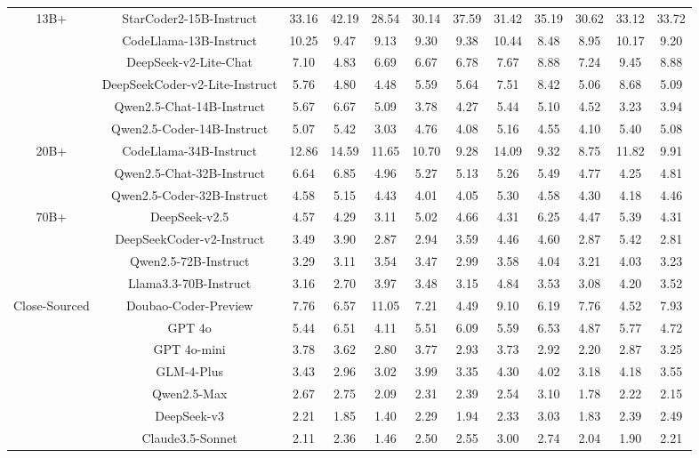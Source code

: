 \documentclass[11pt, a4paper, logo, copyright, nonumbering, amsart]{map}
\begin{document}
\begin{CJK*}{UTF8}{gbsn}
\begin{table*}[h!]
\begin{adjustbox}{width=\textwidth}
\begin{tabular}{c|c|cccccccccc}
    \midrule
    \multirow{6}{*}{13B+} 
    & StarCoder2-15B-Instruct & 33.16 & 42.19 & 28.54 & 30.14 & 37.59 & 31.42 & 35.19 & 30.62 & 33.12 & 33.72 \\
    & CodeLlama-13B-Instruct & 10.25 & 9.47 & 9.13 & 9.30 & 9.38 & 10.44 & 8.48 & 8.95 & 10.17 & 9.20 \\ 
    & DeepSeek-v2-Lite-Chat & 7.10 & 4.83 & 6.69 & 6.67 & 6.78 & 7.67 & 8.88 & 7.24 & 9.45 & 8.88 \\
    & DeepSeekCoder-v2-Lite-Instruct & 5.76 & 4.80 & 4.48 & 5.59 & 5.64 & 7.51 & 8.42 & 5.06 & 8.68 & 5.09 \\
    & Qwen2.5-Chat-14B-Instruct & 5.67 & 6.67 & 5.09 & 3.78 & 4.27 & 5.44 & 5.10 & 4.52 & 3.23 & 3.94 \\
    & Qwen2.5-Coder-14B-Instruct & 5.07 & 5.42 & 3.03 & 4.76 & 4.08 & 5.16 & 4.55 & 4.10 & 5.40 & 5.08 \\ 
    
    \midrule
    \multirow{3}{*}{20B+}
    & CodeLlama-34B-Instruct & 12.86 & 14.59 & 11.65 & 10.70 & 9.28 & 14.09 & 9.32 & 8.75 & 11.82 & 9.91 \\ 
    & Qwen2.5-Chat-32B-Instruct & 6.64 & 6.85 & 4.96 & 5.27 & 5.13 & 5.26 & 5.49 & 4.77 & 4.25 & 4.81 \\
    & Qwen2.5-Coder-32B-Instruct & 4.58 & 5.15 & 4.43 & 4.01 & 4.05 & 5.30 & 4.58 & 4.30 & 4.18 & 4.46 \\ 
    
    \midrule
    \multirow{4}{*}{70B+} 
    & DeepSeek-v2.5 & 4.57 & 4.29 & 3.11 & 5.02 & 4.66 & 4.31 & 6.25 & 4.47 & 5.39 & 4.31 \\ 
    & DeepSeekCoder-v2-Instruct & 3.49 & 3.90 & 2.87 & 2.94 & 3.59 & 4.46 & 4.60 & 2.87 & 5.42 & 2.81 \\ 
    & Qwen2.5-72B-Instruct & 3.29 & 3.11 & 3.54 & 3.47 & 2.99 & 3.58 & 4.04 & 3.21 & 4.03 & 3.23 \\
    & Llama3.3-70B-Instruct & 3.16 & 2.70 & 3.97 & 3.48 & 3.15 & 4.84 & 3.53 & 3.08 & 4.20 & 3.52 \\
    
    \midrule
    \multirow{7}{*}{Close-Sourced}
    & Doubao-Coder-Preview & 7.76 & 6.57 & 11.05 & 7.21 & 4.49 & 9.10 & 6.19 & 7.76 & 4.52 & 7.93 \\
    & GPT 4o & 5.44 & 6.51 & 4.11 & 5.51 & 6.09 & 5.59 & 6.53 & 4.87 & 5.77 & 4.72 \\
    & GPT 4o-mini & 3.78 & 3.62 & 2.80 & 3.77 & 2.93 & 3.73 & 2.92 & 2.20 & 2.87 & 3.25 \\
    & GLM-4-Plus & 3.43 & 2.96 & 3.02 & 3.99 & 3.35 & 4.30 & 4.02 & 3.18 & 4.18 & 3.55 \\
    & Qwen2.5-Max & 2.67 & 2.75 & 2.09 & 2.31 & 2.39 & 2.54 & 3.10 & 1.78 & 2.22 & 2.15 \\
    & DeepSeek-v3 & 2.21 & 1.85 & 1.40 & 2.29 & 1.94 & 2.33 & 3.03 & 1.83 & 2.39 & 2.49 \\
    & Claude3.5-Sonnet & 2.11 & 2.36 & 1.46 & 2.50 & 2.55 & 3.00 & 2.74 & 2.04 & 1.90 & 2.21 \\
    

\end{tabular}
\end{adjustbox}
\end{table*}
\end{CJK*}
\end{document}
